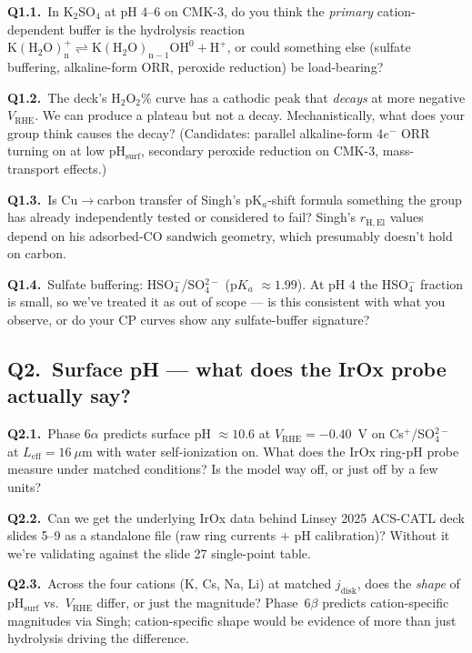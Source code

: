 \documentclass[11pt]{article}
\begin{document}
\begin{questionbox}[Q1: Mechanism]
\textbf{Q1.1.}~In K$_2$SO$_4$ at pH 4--6 on CMK-3, do you think the
\emph{primary} cation-dependent buffer is the hydrolysis reaction
$\mathrm{K(H_2O)_n^+ \rightleftharpoons K(H_2O)_{n-1}OH^0 + H^+}$,
or could something else (sulfate buffering, alkaline-form ORR,
peroxide reduction) be load-bearing?

\textbf{Q1.2.}~The deck's H$_2$O$_2$\% curve has a cathodic peak that
\emph{decays} at more negative $V_{\mathrm{RHE}}$.  We can produce a
plateau but not a decay.  Mechanistically, what does your group think
causes the decay?  (Candidates: parallel alkaline-form 4$e^-$ ORR
turning on at low pH$_{\mathrm{surf}}$, secondary peroxide reduction
on CMK-3, mass-transport effects.)

\textbf{Q1.3.}~Is Cu$\to$carbon transfer of Singh's pK$_a$-shift
formula something the group has already independently tested or
considered to fail?  Singh's $r_{\mathrm{H,El}}$ values depend on his
adsorbed-CO sandwich geometry, which presumably doesn't hold on
carbon.

\textbf{Q1.4.}~Sulfate buffering: HSO$_4^-$/SO$_4^{2-}$ (p$K_a$ $\approx
1.99$).  At pH 4 the HSO$_4^-$ fraction is small, so we've treated it
as out of scope --- is this consistent with what you observe, or do
your CP curves show any sulfate-buffer signature?
\end{questionbox}

\subsection*{Q2.\ Surface pH --- what does the IrOx probe actually say?}

\begin{questionbox}
\textbf{Q2.1.}~Phase 6$\alpha$ predicts surface pH $\approx 10.6$ at
$V_{\mathrm{RHE}}=-0.40$~V on Cs$^+$/SO$_4^{2-}$ at $L_{\mathrm{eff}}=16~\mu$m
with water self-ionization on.  What does the IrOx ring-pH probe
measure under matched conditions?  Is the model way off, or just
off by a few units?

\textbf{Q2.2.}~Can we get the underlying IrOx data behind Linsey 2025
ACS-CATL deck slides 5--9 as a standalone file (raw ring currents +
pH calibration)?  Without it we're validating against the slide 27
single-point table.

\textbf{Q2.3.}~Across the four cations (K, Cs, Na, Li) at matched
$j_{\mathrm{disk}}$, does the \emph{shape} of pH$_{\mathrm{surf}}$
vs.\ $V_{\mathrm{RHE}}$ differ, or just the magnitude?  Phase~6$\beta$
predicts cation-specific magnitudes via Singh; cation-specific shape
would be evidence of more than just hydrolysis driving the
difference.
\end{questionbox}
\end{document}
